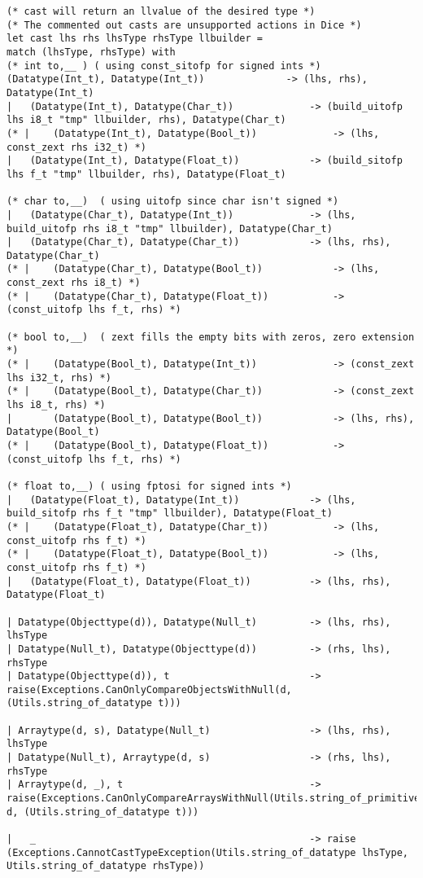 \begin{verbatim}
(* cast will return an llvalue of the desired type *)
(* The commented out casts are unsupported actions in Dice *)
let cast lhs rhs lhsType rhsType llbuilder = 
match (lhsType, rhsType) with
(* int to,__ ) ( using const_sitofp for signed ints *)
(Datatype(Int_t), Datatype(Int_t))				-> (lhs, rhs), Datatype(Int_t)
| 	(Datatype(Int_t), Datatype(Char_t))				-> (build_uitofp lhs i8_t "tmp" llbuilder, rhs), Datatype(Char_t)
(* |   	(Datatype(Int_t), Datatype(Bool_t))				-> (lhs, const_zext rhs i32_t) *)
|   (Datatype(Int_t), Datatype(Float_t)) 			-> (build_sitofp lhs f_t "tmp" llbuilder, rhs), Datatype(Float_t)

(* char to,__)  ( using uitofp since char isn't signed *)
|   (Datatype(Char_t), Datatype(Int_t)) 			-> (lhs, build_uitofp rhs i8_t "tmp" llbuilder), Datatype(Char_t)
|   (Datatype(Char_t), Datatype(Char_t)) 			-> (lhs, rhs), Datatype(Char_t)
(* | 	(Datatype(Char_t), Datatype(Bool_t))			-> (lhs, const_zext rhs i8_t) *)
(* | 	(Datatype(Char_t), Datatype(Float_t))			-> (const_uitofp lhs f_t, rhs) *)

(* bool to,__)  ( zext fills the empty bits with zeros, zero extension *)
(* |   	(Datatype(Bool_t), Datatype(Int_t)) 			-> (const_zext lhs i32_t, rhs) *)
(* | 	(Datatype(Bool_t), Datatype(Char_t))			-> (const_zext lhs i8_t, rhs) *)
|   	(Datatype(Bool_t), Datatype(Bool_t))			-> (lhs, rhs), Datatype(Bool_t)
(* |   	(Datatype(Bool_t), Datatype(Float_t))			-> (const_uitofp lhs f_t, rhs) *)

(* float to,__) ( using fptosi for signed ints *)
|   (Datatype(Float_t), Datatype(Int_t)) 			-> (lhs, build_sitofp rhs f_t "tmp" llbuilder), Datatype(Float_t)
(* | 	(Datatype(Float_t), Datatype(Char_t))			-> (lhs, const_uitofp rhs f_t) *)
(* |   	(Datatype(Float_t), Datatype(Bool_t))			-> (lhs, const_uitofp rhs f_t) *)
|   (Datatype(Float_t), Datatype(Float_t)) 			-> (lhs, rhs), Datatype(Float_t)

| Datatype(Objecttype(d)), Datatype(Null_t)			-> (lhs, rhs), lhsType
| Datatype(Null_t), Datatype(Objecttype(d)) 		-> (rhs, lhs), rhsType
| Datatype(Objecttype(d)), t 						-> raise(Exceptions.CanOnlyCompareObjectsWithNull(d, (Utils.string_of_datatype t)))

| Arraytype(d, s), Datatype(Null_t)					-> (lhs, rhs), lhsType
| Datatype(Null_t), Arraytype(d, s) 				-> (rhs, lhs), rhsType
| Arraytype(d, _), t 								-> raise(Exceptions.CanOnlyCompareArraysWithNull(Utils.string_of_primitive d, (Utils.string_of_datatype t)))

| 	_ 												-> raise (Exceptions.CannotCastTypeException(Utils.string_of_datatype lhsType, Utils.string_of_datatype rhsType))


\end{verbatim}
